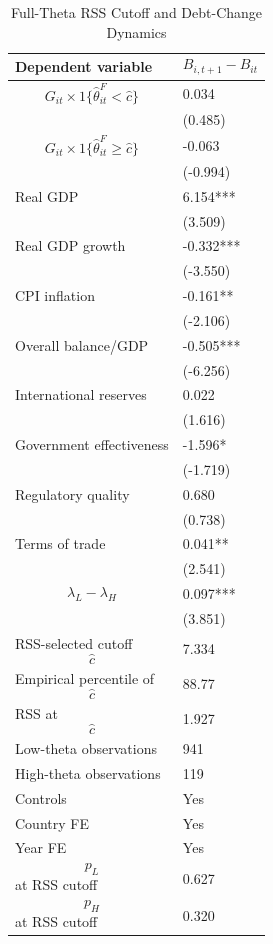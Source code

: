 \begin{table}[H]\centering
\begin{threeparttable}
\caption{Full-Theta RSS Cutoff and Debt-Change Dynamics}
\label{tab:deltaB_rss_cutoff_fulltheta}
\scriptsize
\begin{tabularx}{\textwidth}{lY}
\toprule
Dependent variable & $$B_{i,t+1}-B_{it}$$ \\
\midrule
$$G_{it}\times 1\{\widehat{\theta}^{F}_{it}<\widehat{c}\}$$ & 0.034 \\
 & (0.485) \\
$$G_{it}\times 1\{\widehat{\theta}^{F}_{it}\geq\widehat{c}\}$$ & -0.063 \\
 & (-0.994) \\
Real GDP & 6.154*** \\
 & (3.509) \\
Real GDP growth & -0.332*** \\
 & (-3.550) \\
CPI inflation & -0.161** \\
 & (-2.106) \\
Overall balance/GDP & -0.505*** \\
 & (-6.256) \\
International reserves & 0.022 \\
 & (1.616) \\
Government effectiveness & -1.596* \\
 & (-1.719) \\
Regulatory quality & 0.680 \\
 & (0.738) \\
Terms of trade & 0.041** \\
 & (2.541) \\
$$\lambda_L-\lambda_H$$ & 0.097*** \\
 & (3.851) \\
\midrule
RSS-selected cutoff $$\widehat{c}$$ & 7.334 \\
Empirical percentile of $$\widehat{c}$$ & 88.77 \\
RSS at $$\widehat{c}$$ & 1.927 \\
Low-theta observations & 941 \\
High-theta observations & 119 \\
Controls & Yes \\
Country FE & Yes \\
Year FE & Yes \\
$$p_L$$ at RSS cutoff & 0.627 \\
$$p_H$$ at RSS cutoff & 0.320 \\

\end{tabularx}
\end{threeparttable}
\end{table}
